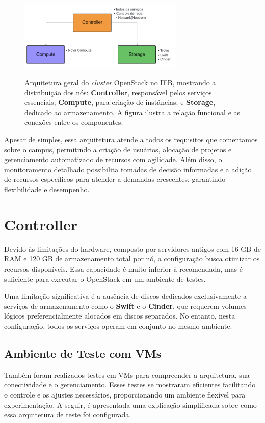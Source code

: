 \begin{figure}[htbp]
    \centering
    \caption{Arquitetura geral do \textit{cluster} OpenStack no IFB, mostrando a distribuição dos nós: \textbf{Controller}, responsável pelos serviços essenciais; \textbf{Compute}, para criação de instâncias; e \textbf{Storage}, dedicado ao armazenamento. A figura ilustra a relação funcional e as conexões entre os componentes.}
    \includegraphics[width=0.7\textwidth]{images/cluster_architecture.png}
    \label{fig:cluster_architecture}
\end{figure}

Apesar de simples, essa arquitetura atende a todos os requisitos que comentamos sobre o campus, permitindo a criação de usuários, alocação de projetos e gerenciamento automatizado de recursos com agilidade. Além disso, o monitoramento detalhado possibilita tomadas de decisão informadas e a adição de recursos específicos para atender a demandas crescentes, garantindo flexibilidade e desempenho.

\section{Controller}

Devido às limitações do hardware, composto por servidores antigos com 16 GB de RAM e 120 GB de armazenamento total por nó, a configuração busca otimizar os recursos disponíveis. Essa capacidade é muito inferior à recomendada, mas é suficiente para executar o OpenStack em um ambiente de testes.

Uma limitação significativa é a ausência de discos dedicados exclusivamente a serviços de armazenamento como o \textbf{Swift} e o \textbf{Cinder}, que requerem volumes lógicos preferencialmente alocados em discos separados. No entanto, nesta configuração, todos os serviços operam em conjunto no mesmo ambiente.

\subsection{Ambiente de Teste com VMs}
Também foram realizados testes em VMs para compreender a arquitetura, sua conectividade e o gerenciamento. Esses testes se mostraram eficientes facilitando o controle e os ajustes necessários, proporcionando um ambiente flexível para experimentação. A seguir, é apresentada uma explicação simplificada sobre como essa arquitetura de teste foi configurada.

